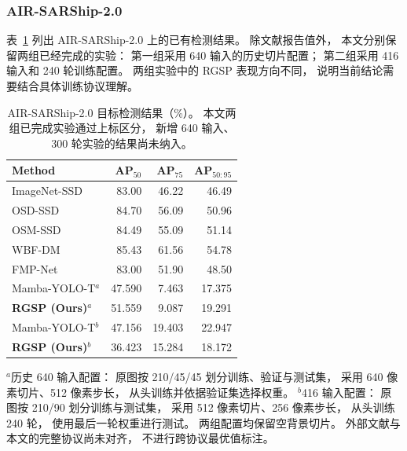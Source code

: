 \documentclass[journal]{IEEEtran}
\begin{document}
\subsubsection{AIR-SARShip-2.0}
\label{sec:air_sarship_results}

表~\ref{tab:air_sarship_comparison}
列出 AIR-SARShip-2.0 上的已有检测结果。
除文献报告值外，
本文分别保留两组已经完成的实验：
第一组采用 640 输入的历史切片配置；
第二组采用 416 输入和 240 轮训练配置。
两组实验中的 RGSP 表现方向不同，
说明当前结论需要结合具体训练协议理解。

\begin{table}[!tbp]
\centering
\small
\setlength{\tabcolsep}{3pt}
\caption{AIR-SARShip-2.0 目标检测结果（\%）。
本文两组已完成实验通过上标区分，
新增 640 输入、300 轮实验的结果尚未纳入。}
\label{tab:air_sarship_comparison}
\begin{tabular*}{\linewidth}{@{\extracolsep{\fill}}lrrr}
\toprule
Method & AP$_{50}$ & AP$_{75}$ & AP$_{50:95}$ \\
\midrule
ImageNet-SSD      & 83.00 & 46.22 & 46.49 \\
OSD-SSD           & 84.70 & 56.09 & 50.96 \\
OSM-SSD           & 84.49 & 55.09 & 51.14 \\
WBF-DM            & 85.43 & 61.56 & 54.78 \\
FMP-Net           & 83.00 & 51.90 & 48.50 \\
\midrule
Mamba-YOLO-T$^{a}$
                  & 47.590 & 7.463  & 17.375 \\
\textbf{RGSP (Ours)}$^{a}$
                  & 51.559 & 9.087  & 19.291 \\
Mamba-YOLO-T$^{b}$
                  & 47.156 & 19.403 & 22.947 \\
\textbf{RGSP (Ours)}$^{b}$
                  & 36.423 & 15.284 & 18.172 \\
\bottomrule
\end{tabular*}

\smallskip
\begin{minipage}{\linewidth}
\footnotesize
$^{a}$历史 640 输入配置：
原图按 210/45/45 划分训练、验证与测试集，
采用 640 像素切片、512 像素步长，
从头训练并依据验证集选择权重。
$^{b}$416 输入配置：
原图按 210/90 划分训练与测试集，
采用 512 像素切片、256 像素步长，
从头训练 240 轮，
使用最后一轮权重进行测试。
两组配置均保留空背景切片。
外部文献与本文的完整协议尚未对齐，
不进行跨协议最优值标注。
\end{minipage}
\end{table}
\end{document}
